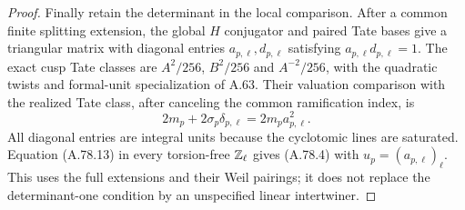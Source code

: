 \begin{proof}
Finally retain the determinant in the local comparison.
After a common finite splitting extension, the global
$H$ conjugator and paired Tate bases give a triangular
matrix with diagonal entries $a_{p,\ell},d_{p,\ell}$
satisfying $a_{p,\ell}d_{p,\ell}=1$.
The exact cusp Tate classes are
$A^2/256$, $B^2/256$ and $A^{-2}/256$, with the
quadratic twists and formal-unit specialization of A.63.
Their valuation comparison with the realized Tate class,
after canceling the common ramification index, is
\[
          2m_p+2\sigma_p\delta_{p,\ell}
                           =2m_p a_{p,\ell}^{2}.
\tag{A.78.13}
\]
All diagonal entries are integral units because the
cyclotomic lines are saturated.  Equation (A.78.13)
in every torsion-free $\mathbb Z_\ell$ gives (A.78.4) with
$u_p=(a_{p,\ell})_\ell$.
This uses the full extensions and their Weil pairings;
it does not replace the determinant-one condition by
an unspecified linear intertwiner.
\end{proof}

